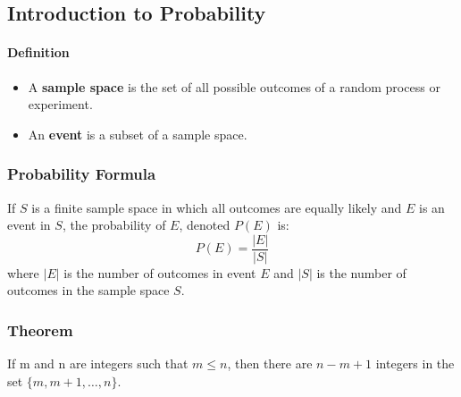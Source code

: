 \subsection{Introduction to Probability}
\hrulefill
\paragraph*{Definition}
\begin{itemize}
    \item A \textbf{sample space} is the set of all possible outcomes of a random process or experiment.
    \item An \textbf{event} is a subset of a sample space.
\end{itemize}

\subsubsection*{Probability Formula}
If $S$ is a finite sample space in which all outcomes are equally likely and $E$ is an event in $S$,
the probability of $E$, denoted $P(E)$ is:
\begin{equation*}
    P(E) = \frac{|E|}{|S|}
\end{equation*}
where $|E|$ is the number of outcomes in event $E$ and $|S|$ is the number of outcomes in the sample space $S$.

\subsubsection*{Theorem}
If m and n are integers such that $m \leq n$, then there are $n-m+1$ integers in the set $\{m, m+1, \ldots, n\}$.

